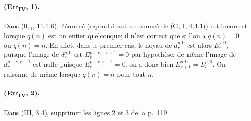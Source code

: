 \paragraph{(Err\textsubscript{IV}, 1).}
Dans ($0_{\mathrm{III}}$, 11.1.6), l'énoncé (reproduisant un énoncé de
(G, I, 4.4.1)) est incorrect lorsque $q(n)$ est un entier quelconque;
il n'est correct que si l'on a $q(n)=0$ ou $q(n)=n$. En effet, dans le
premier cas, le noyau de $d_r^{p,0}$ est alors $E_r^{p,0}$, puisque
l'image de $d_r^{p,0}$ est $E_r^{p+r,-r+1}=0$ par hypothèse; de même
l'image de $d_r^{p-r,r-1}$ est nulle puisque
$E_r^{p-r,r-1}=0$; on a donc bien $E_{r+1}^{p,0}=E_r^{p,0}$. On
raisonne de même lorsque $q(n)=n$ pour tout $n$.

\paragraph{(Err\textsubscript{IV}, 2).}
Dans (III, 3.4), supprimer les lignes 2 et 3 de la p.~119.

